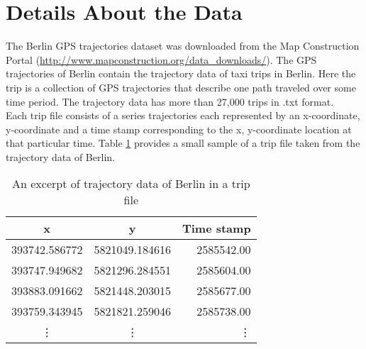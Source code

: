 \documentclass[11pt]{article}
\begin{document}
\section*{Details About the Data}
The Berlin GPS trajectories dataset was downloaded from the Map Construction Portal (\url{http://www.mapconstruction.org/data_downloads/}). 
The GPS trajectories of Berlin contain the trajectory data of taxi trips in Berlin. Here the trip is a collection of GPS trajectories that describe one path traveled over some time period. The trajectory data has more than 27,000 trips in .txt format. \\
Each trip file consists of a series trajectories each represented by an x-coordinate, y-coordinate and a time stamp corresponding to the x, y-coordinate location at that particular time. Table \ref{table:questions} provides a small sample of a trip file taken from the trajectory data of Berlin.
\begin{table}
\begin{center}
\begin{tabular}{ |c |c| r| }
\hline
  x & y & Time stamp   \\ \hline
  393742.586772 & 5821049.184616 & 2585542.00   \\ \hline
  393747.949682 & 5821296.284551 & 2585604.00 \\  \hline
  393883.091662 & 5821448.203015 & 2585677.00  \\ \hline
  393759.343945 & 5821821.259046 & 2585738.00\\ \hline
  \vdots & \vdots & \vdots \\ \hline
\end{tabular}
\end{center}
\caption{An excerpt of trajectory data of Berlin in a trip file}
\label{table:questions}
\end{table}


\pagebreak
\end{document}
